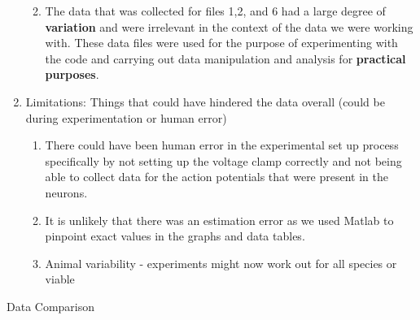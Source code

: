 \begin{enumerate}
  \begin{enumerate}
  \def\labelenumii{\alph{enumii}.}
  \item
    The data that was collected for files 1,2, and 6 had a large degree
    of \textbf{variation} and were irrelevant in the context of the data
    we were working with. These data files were used for the purpose of
    experimenting with the code and carrying out data manipulation and
    analysis for \textbf{practical purposes}.
  \end{enumerate}
\item
  Limitations: Things that could have hindered the data overall (could
  be during experimentation or human error)

  \begin{enumerate}
  \def\labelenumii{\alph{enumii}.}
  \item
    There could have been human error in the experimental set up process
    specifically by not setting up the voltage clamp correctly and not
    being able to collect data for the action potentials that were
    present in the neurons.
  \item
    It is unlikely that there was an estimation error as we used Matlab
    to pinpoint exact values in the graphs and data tables.
  \item
    Animal variability - experiments might now work out for all species
    or viable
  \end{enumerate}
\end{enumerate}

Data Comparison

